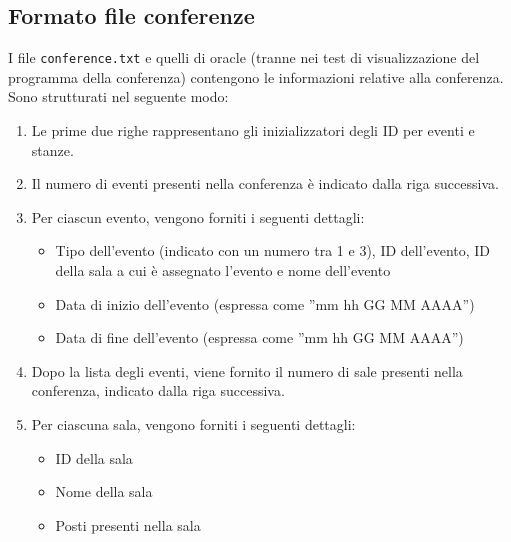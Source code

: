 \documentclass[11pt]{scrartcl} %
\begin{document}
\subsection{Formato file conferenze}
I file \texttt{conference.txt} e quelli di oracle (tranne nei test di visualizzazione del programma della conferenza) contengono le informazioni relative alla conferenza. Sono strutturati nel seguente modo:

\begin{enumerate}
	\item Le prime due righe rappresentano gli inizializzatori degli ID per eventi e stanze.
	\item Il numero di eventi presenti nella conferenza è indicato dalla riga successiva.
	\item Per ciascun evento, vengono forniti i seguenti dettagli:
	      \begin{itemize}
		      \item Tipo dell'evento (indicato con un numero tra 1 e 3), ID dell'evento, ID della sala a cui è assegnato l'evento e  nome dell'evento
		      \item Data di inizio dell'evento (espressa come ''mm hh GG MM AAAA'')
		      \item Data di fine dell'evento (espressa come ''mm hh GG MM AAAA'')
	      \end{itemize}
	\item Dopo la lista degli eventi, viene fornito il numero di sale presenti nella conferenza, indicato dalla riga successiva.
	\item Per ciascuna sala, vengono forniti i seguenti dettagli:
	      \begin{itemize}
		      \item ID della sala
		      \item Nome della sala
		      \item Posti presenti nella sala
	      \end{itemize}
\end{enumerate}
\end{document}
